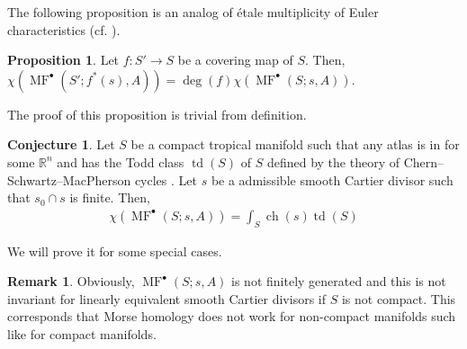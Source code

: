 \documentclass[a4paper,dvipdfmx,reqno,12pt]{amsart}
\theoremstyle{definition}
\newtheorem{Prop}[Thm]{Proposition}
\newtheorem{Conj}[Thm]{Conjecture}
\newtheorem{Rmk}[Thm]{Remark}
\newcommand{\R}{\mathbb{R}}%
\newcommand{\opn}[1]{\operatorname{#1}}
\numberwithin{equation}{section}
\begin{document}
The following proposition is an analog of \'{e}tale multiplicity of Euler characteristics
(cf. \cite[Proposition 1.1.28]{MR2095471}).

\begin{Prop}
Let $f:S' \to S$ be a covering map of $S$.
Then, $\chi(\opn{MF}^{\bullet}(S';f^{*}(s),A))=
\opn{deg}(f)\chi(\opn{MF}^{\bullet}(S;s,A))$.
\end{Prop}

The proof of this proposition is trivial from definition.

\begin{Conj} \label{conj: conj}
Let $S$ be a compact tropical manifold such that any atlas is in for some 
$\R^{n}$ and has the Todd class $\opn{td}(S)$ of $S$ 
defined by the theory of Chern--Schwartz--MacPherson
cycles
\cite[Previous work]{lopezdemedranoChernSchwartzMacPhersonCyclesMatroids2020}.
Let $s$ be a admissible smooth Cartier divisor such that
$s_0\cap s$ is finite. Then, 
\begin{align}
\chi(\opn{MF}^{\bullet}(S;s,A))=\int_{S}\opn{ch}(s)\opn{td}(S)
\end{align}
\end{Conj}
We will prove it for some special cases.

\begin{Rmk}
Obviously, $\opn{MF}^{\bullet}(S;s,A)$ is not finitely
generated and this is not invariant for linearly 
equivalent smooth Cartier divisors
if $S$ is not compact.
This corresponds that Morse homology does not work
for non-compact manifolds such like for compact manifolds.
\end{Rmk}
\end{document}
